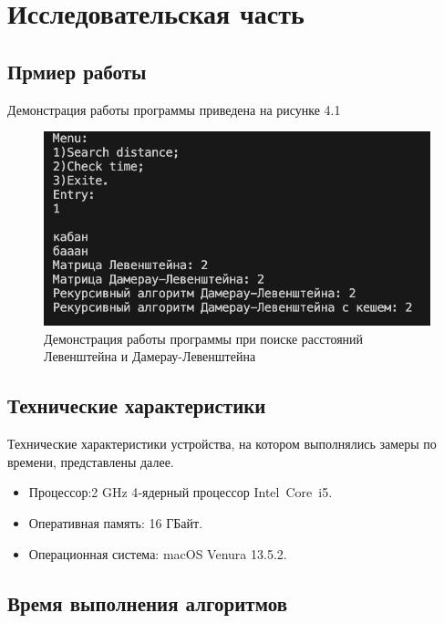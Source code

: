 \chapter{Исследовательская часть}

\section{Прмиер работы}
Демонстрация работы программы приведена на рисунке 4.1

\begin{figure}[h]
	\centering
	\includegraphics[height=0.2\textheight]{img/example.jpg}
	\caption{Демонстрация работы программы при поиске расстояний Левенштейна и Дамерау-Левенштейна}
	\label{img:demonstration}
\end{figure}

\section{Технические характеристики}

Технические характеристики устройства, на котором выполнялись замеры по времени, представлены далее.

\begin{itemize}
	\item Процессор:2 GHz 4‑ядерный процессор Intel Core i5.
	\item Оперативная память: 16 ГБайт.
	\item Операционная система: macOS Venura 13.5.2. 
\end{itemize}

\clearpage

\section{Время выполнения алгоритмов}

